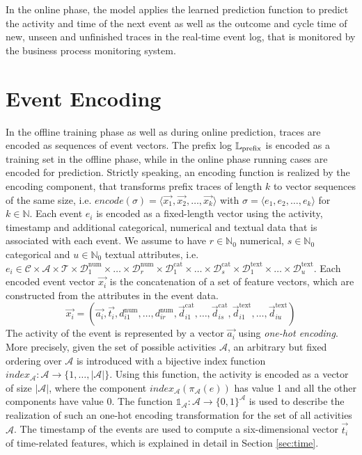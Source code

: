 In the online phase, the model applies the learned prediction function to predict the activity and time of the next event as well as the outcome and cycle time of new, unseen and unfinished traces in the real-time event log, that is monitored by the business process monitoring system.

\section{Event Encoding}\label{sec:event}

In the offline training phase as well as during online prediction, traces are encoded as sequences of event vectors.
The prefix log $\mathbb{L}_\mathrm{prefix}$ is encoded as a training set in the offline phase, while in the online phase running cases are encoded for prediction.
Strictly speaking, an encoding function is realized by the encoding component, that transforms prefix traces of length $k$ to vector sequences of the same size, i.e. $encode(\sigma) = \langle \vec{x_1}, \vec{x_2}, \dots, \vec{x_k}\rangle$ with $\sigma = \langle e_1, e_2, \dots, e_k\rangle$ for $k \in \mathbb{N}$.
Each event $e_i$ is encoded as a fixed-length vector using the activity, timestamp and additional categorical, numerical and textual data that is associated with each event.
We assume to have $r \in \mathbb{N}_0$ numerical, $s \in \mathbb{N}_0$ categorical and $u \in \mathbb{N}_0$ textual attributes, i.e. $e_i \in \mathcal{C} \times \mathcal{A}  \times \mathcal{T} \times \mathcal{D}_1^\mathrm{num} \times \dots \times \mathcal{D}_r^\mathrm{num}   \times \mathcal{D}_1^\mathrm{cat}  \times  \dots  \times \mathcal{D}_s^\mathrm{cat}   \times \mathcal{D}_1^\mathrm{text}   \times \dots  \times \mathcal{D}_u^\mathrm{text}$.
Each encoded event vector $\vec{x_i}$ is the concatenation of a set of feature vectors, which are constructed from the attributes in the event data.
\begin{equation*}
\vec{x_i}=(
\vec{a_i},
\vec{t_i},
d_{i1}^\mathrm{num}, \dots, d_{ir}^\mathrm{num},
\vec{d}_{i1}^\mathrm{cat}, \dots,\vec{d}_{is}^\mathrm{cat},
\vec{d}_{i1}^\mathrm{text}, \dots, \vec{d}_{iu}^\mathrm{text})
\end{equation*}
The activity of the event is represented by a vector $\vec{a_i}$ using \textit{one-hot encoding}.
More precisely, given the set of possible activities $\mathcal{A}$, an arbitrary but fixed ordering over $\mathcal{A}$ is introduced with a bijective index function $index_\mathcal{A} \colon \mathcal{A} \to \{1, \dots, |\mathcal{A}|\}$.
Using this function, the activity is encoded as a vector of size $|\mathcal{A}|$, where the component $index_\mathcal{A}(\pi_\mathcal{A}(e))$ has value 1 and all the other components have value 0.
The function $\mathds{1}_\mathcal{A}\colon \mathcal{A} \to \{0,1\}^\mathcal{A}$ is used to describe the realization of such an one-hot encoding transformation for the set of all activities $\mathcal{A}$.
The timestamp of the events are used to compute a six-dimensional vector $\vec{t_i}$ of time-related features, which is explained in detail in Section \ref*{sec:time}.

